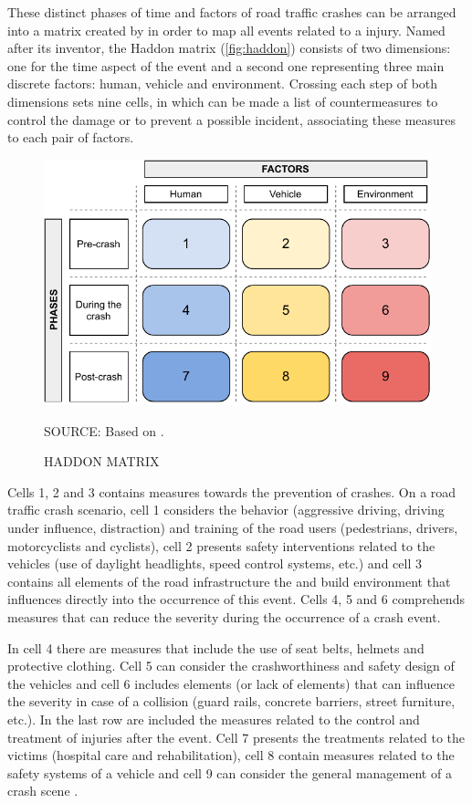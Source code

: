 These distinct phases of time and factors of road traffic crashes can be arranged into a matrix created by \textcite{Haddon1980} in order to map all events related to a injury. Named after its inventor, the Haddon matrix (\autoref{fig:haddon}) consists of two dimensions: one for the time aspect of the event and a second one representing three main discrete factors: human, vehicle and environment. Crossing each step of both dimensions sets nine cells, in which can be made a list of countermeasures to control the damage or to prevent a possible incident, associating these measures to each pair of factors. 

\begin{figure}[!htbp]
    \centering\footnotesize
    \captionsetup{font=footnotesize}
    \caption{HADDON MATRIX}
    \includegraphics{fig/haddon.pdf}
    \label{fig:haddon}
    \par SOURCE: Based on \textcite{Haddon1980}.
\end{figure} 

Cells 1, 2 and 3 contains measures towards the prevention of crashes. On a road traffic crash scenario, cell 1 considers the behavior (aggressive driving, driving under influence, distraction) and training of the road users (pedestrians, drivers, motorcyclists and cyclists), cell 2 presents safety interventions related to the vehicles (use of daylight headlights, speed control systems, etc.) and cell 3 contains all elements of the road infrastructure the and build environment that influences directly into the occurrence of this event. Cells 4, 5 and 6 comprehends measures that can reduce the severity during the occurrence of a crash event.

In cell 4 there are measures that include the use of seat belts, helmets and protective clothing. Cell 5 can consider the crashworthiness and safety design of the vehicles and cell 6 includes elements (or lack of elements) that can influence the severity in case of a collision (guard rails, concrete barriers, street furniture, etc.). In the last row are included the measures related to the control and treatment of injuries after the event. Cell 7 presents the treatments related to the victims (hospital care and rehabilitation), cell 8 contain measures related to the safety systems of a vehicle and cell 9 can consider the general management of a crash scene \cite{Mohan2016}. 

